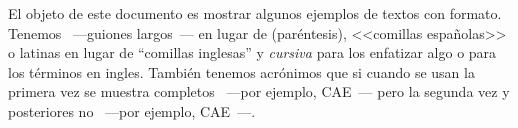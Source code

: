
El objeto de este documento es mostrar algunos ejemplos de textos con formato.
Tenemos ~---guiones largos~--- en lugar de (paréntesis), <<comillas españolas>>
o latinas en lugar de ``comillas inglesas'' y \emph{cursiva} para los enfatizar
algo o para los términos en ingles. También tenemos acrónimos que si cuando se
usan la primera vez se muestra completos ~---por ejemplo, \ac{CAE}~--- pero la segunda vez y
posteriores no ~---por ejemplo, \ac{CAE}~---.

\Blindtext
